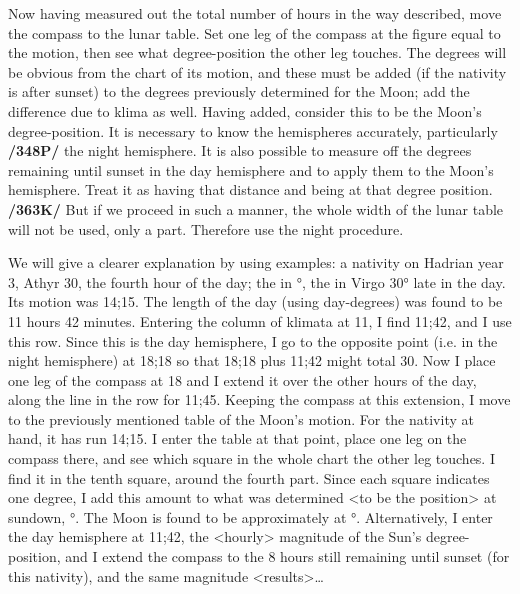 Now having measured out the total number of hours in the way described, move the compass to the lunar table. Set one leg of the compass at the figure equal to the motion, then see what degree-position the other leg touches. The degrees will be obvious from the chart of its motion, and these must be added (if the nativity is after sunset) to the degrees previously determined for the Moon; add the difference due to klima as well. Having added, consider this to be the Moon’s degree-position. It is necessary to know the hemispheres accurately, particularly \textbf{/348P/} the night hemisphere. It is also possible to measure off the degrees remaining until sunset in the day hemisphere and to apply them to the Moon’s hemisphere. Treat it as having that distance and being at that degree position. \textbf{/363K/} But if we proceed in such a manner, the whole width of the lunar table will not be used, only a part. Therefore use the night procedure.

We will give a clearer explanation by using examples: a nativity on Hadrian year 3, Athyr 30, the fourth hour of the day; the \Sun\xspace in \Scorpio\xspace 7°, the \Moon\xspace in Virgo\xspace 30° late in the day. Its motion was 14;15. The length of the day (using day-degrees) was found to be 11 hours 42 minutes. Entering the column of klimata at 11, I find 11;42, and I use this row. Since this is the day hemisphere, I go to the opposite point (i.e. in the night hemisphere) at 18;18 so that 18;18 plus 11;42 might total 30. Now I place one leg of the compass at 18 and I extend it over the other hours of the day, along the line in the row for 11;45. Keeping the compass at this extension, I move to the previously mentioned table of the Moon’s motion. For the nativity at hand, it has run 14;15. I enter the table at that point, place one leg on the compass there, and see which square in the whole chart the other leg touches. I find it in the tenth square, around the fourth part. Since each square indicates one degree, I add this amount to what was determined <to be the position> at sundown, \Virgo\xspace 30°. The Moon is found to be approximately at \Libra\xspace 11°. Alternatively, I enter the day hemisphere at 11;42, the <hourly> magnitude of the Sun’s degree-position, and I extend the compass to the 8 hours still remaining until sunset (for this nativity), and the same magnitude <results>…

\newpage
